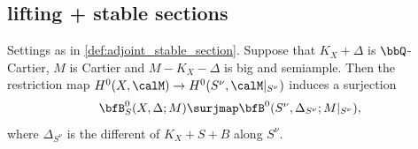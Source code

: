 \subsection{lifting + stable sections}


    \begin{theorem}\label{thm:stable_section_lifting}
        Settings as in \cref{def:adjoint_stable_section}.
        Suppose that \(K_X + \Delta\) is \(\bbQ\)-Cartier, \(M\) is Cartier and \(M-K_X-\Delta\) is big and semiample.
        Then the restriction map \(H^0(X,\calM) \to H^0(S^\nu,\calM|_{S^\nu})\) induces a surjection
        \[ \bfB_S^0(X,\Delta;M) \surjmap \bfB^0(S^\nu,\Delta_{S^\nu};M|_{S^\nu}),\]
        where \(\Delta_{S^\nu}\) is the different of \(K_X+S+B\) along \(S^\nu\).
    \end{theorem}
